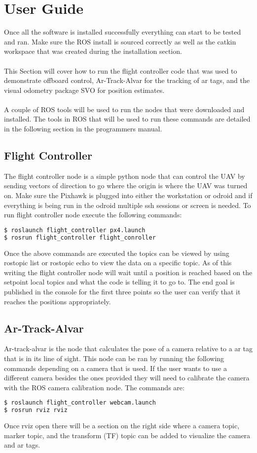 \section{User Guide}
Once all the software is installed successfully everything can start to be tested and ran. Make sure the ROS install is sourced correctly as well as the catkin workspace that was created during the installation section.\\
\\
This Section will cover how to run the flight controller code that was used to demonstrate offboard control, Ar-Track-Alvar for the tracking of ar tags, and the visual odometry package SVO for position estimates.\\
\\
A couple of ROS tools will be used to run the nodes that were downloaded and installed. The tools in ROS that will be used to run these commands are detailed in the following section in the programmers manual.

\subsection{Flight Controller}
The flight controller node is a simple python node that can control the UAV by sending vectors of direction to go where the origin is where the UAV was turned on. Make sure the Pixhawk is plugged into either the workstation or odroid and if everything is being run in the odroid multiple ssh sessions or screen is needed. To run flight controller node execute the following commands:
\begin{lstlisting}[language=bash]
$ roslaunch flight_controller px4.launch
$ rosrun flight_controller flight_conroller
\end{lstlisting}
Once the above commands are executed the topics can be viewed by using rostopic list or rostopic echo to view the data on a specific topic. As of this writing the flight controller node will wait until a position is reached based on the setpoint local topics and what the code is telling it to go to. The end goal is published in the console for the first three points so the user can verify that it reaches the positions appropriately. 
\subsection{Ar-Track-Alvar}
Ar-track-alvar is the node that calculates the pose of a camera relative to a ar tag that is in its line of sight. This node can be ran by running the following commands depending on a camera that is used. If the user wants to use a different camera besides the ones provided they will need to calibrate the camera with the ROS camera calibration node. The commands are:
\begin{lstlisting}[language=bash]
$ roslaunch flight_controller webcam.launch
$ rosrun rviz rviz
\end{lstlisting}
Once rviz open there will be a section on the right side where a camera topic, marker topic, and the transform (TF) topic can be added to visualize the camera and ar tags.
